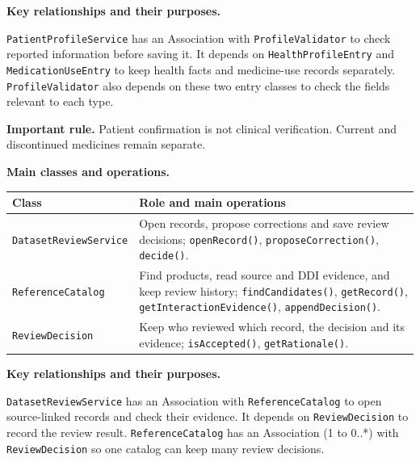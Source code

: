 \documentclass[10pt,letterpaper]{article}
\begin{document}
\noindent\textbf{Key relationships and their purposes.}\par\smallskip
\texttt{PatientProfileService} has an Association with
\texttt{ProfileValidator} to check reported information before saving it.
It depends on \texttt{HealthProfileEntry} and \texttt{MedicationUseEntry}
to keep health facts and medicine-use records separately.
\texttt{ProfileValidator} also depends on these two entry classes to
check the fields relevant to each type.

\noindent\textbf{Important rule.} Patient confirmation is not clinical
verification. Current and discontinued medicines remain separate.



\noindent\textbf{Main classes and operations.}\par\smallskip
\begingroup\small
\noindent\begin{tabularx}{\textwidth}{|L{0.34\textwidth}|Y|}
\hline
\textbf{Class} & \textbf{Role and main operations} \\ \hline
\texttt{DatasetReviewService} & Open records, propose corrections and save review decisions; \texttt{openRecord()}, \texttt{proposeCorrection()}, \texttt{decide()}. \\ \hline
\texttt{ReferenceCatalog} & Find products, read source and DDI evidence, and keep review history; \texttt{findCandidates()}, \texttt{getRecord()}, \texttt{getInteractionEvidence()}, \texttt{appendDecision()}. \\ \hline
\texttt{ReviewDecision} & Keep who reviewed which record, the decision and its evidence; \texttt{isAccepted()}, \texttt{getRationale()}. \\ \hline
\end{tabularx}\par
\endgroup

\noindent\textbf{Key relationships and their purposes.}\par\smallskip
\texttt{DatasetReviewService} has an Association with
\texttt{ReferenceCatalog} to open source-linked records and check their
evidence. It depends on \texttt{ReviewDecision} to record the review result.
\texttt{ReferenceCatalog} has an Association (1 to 0..*) with
\texttt{ReviewDecision} so one catalog can keep many review decisions.
\end{document}
